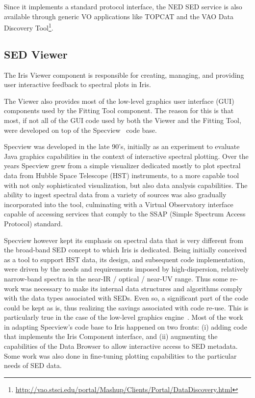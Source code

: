 \documentclass[final,5p]{elsarticle}
\begin{document}
Since it implements a standard protocol interface, the NED SED service is also available through generic VO applications like TOPCAT and the VAO Data Discovery Tool\footnote{\url{http://vao.stsci.edu/portal/Mashup/Clients/Portal/DataDiscovery.html}}.

\subsection{SED Viewer}
\label{subsec:specview}
The Iris Viewer component is responsible for creating, managing, and providing user interactive feedback to spectral plots in Iris.

The Viewer also provides most of the low-level graphics user interface (GUI) components used by the Fitting Tool component. The reason for this is that most, if not all of the GUI code used by both the Viewer and the Fitting Tool, were developed on top of the Specview~\citep{2002ASPC..281..120B} code base.

Specview was developed in the late 90's, initially as an experiment to evaluate Java graphics capabilities in the context of interactive spectral plotting. Over the years Specview grew from a simple visualizer dedicated mostly to plot spectral data from Hubble Space Telescope (HST) instruments, to a more capable tool with not only sophisticated visualization, but also data analysis capabilities. The ability to ingest spectral data from a variety of sources was also gradually incorporated into the tool, culminating with a Virtual Observatory interface capable of accessing services that comply to the SSAP (Simple Spectrum Access Protocol) standard.

Specview however kept its emphasis on spectral data that is very different from the broad-band SED concept to which Iris is dedicated. Being initially conceived as a tool to support HST data, its design, and subsequent code implementation, were driven by the needs and requirements imposed by high-dispersion, relatively narrow-band spectra in the near-IR / optical / near-UV range. Thus some re-work was necessary to make its internal data structures and algorithms comply with the data types associated with SEDs. Even so, a significant part of the code could be kept as is, thus realizing the savings associated with code re-use. This is particularly true in the case of the low-level graphics engine~\citep{2000ASPC..216...79B}. Most of the work in adapting Specview's code base to Iris happened on two fronts: (i) adding code that implements the Iris Component interface, and (ii) augmenting the capabilities of the Data Browser to allow interactive access to SED metadata. Some work was also done in fine-tuning plotting capabilities to the particular needs of SED data.
\end{document}
